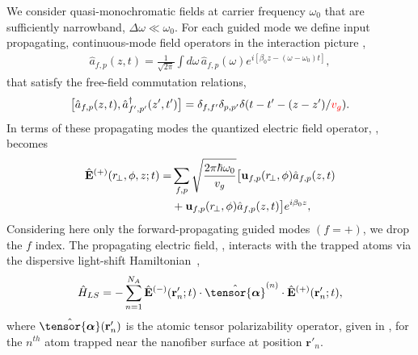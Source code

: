 \documentclass[aps,pra,twocolumn]{revtex4-1} %
\newcommand{\poltens}{\hat{\tensor{\boldsymbol{\alpha}}}}
\newcommand{\error}[1]{{\color{red} #1}}
\begin{document}
We consider quasi-monochromatic fields at carrier frequency $\omega_0$ that are sufficiently narrowband, $\Delta \omega \ll \omega_0$. 
For each guided mode we define input propagating, continuous-mode field operators in the interaction picture \cite{gardiner_input_1985, blow_continuum_1990, le_kien_correlations_2008},
	\begin{align}
		\hat{a}_{f,p}(z,t) =\frac{1}{\sqrt{2 \pi}}  \int d \omega \, \hat{a}_{f,p}(\omega) e^{i[ \beta_0 z- (\omega-\omega_0) t ]}, 
	\end{align}
that satisfy the free-field commutation relations,
	\begin{equation} \label{Eq::InputOutputCommutation}
		\big[\hat{a}_{f,p}(z,t),\hat{a}^\dag_{f',p'}(z',t')\big]=\delta_{f,f'}\delta_{p,p'}  \delta(t-t'-(z-z')/\error{v_g}).
	\end{equation}
In terms of these propagating modes the quantized electric field operator, , becomes
	\begin{align} \label{Eq::PropagatingElectricField}
		\hat{\mathbf{E}}^{(+)}(r\!_\perp,\phi,z;t) 
		=& \sum_{f,p} \sqrt{ \frac{2 \pi \hbar \omega_0}{ v_g} } \big[ \mathbf{u}_{f,p}(r\!_\perp,\phi) \hat{a}_{f,p}(z,t)\nonumber\\
		 &+ \mathbf{u}_{f,p}(r\!_\perp,\phi) \hat{a}_{f,p}(z,t) \big] e^{i \beta_0 z},
	\end{align}	
Considering here only the forward-propagating guided modes $(f=+)$, we  drop the $f$ index.  
The propagating electric field, , interacts with the trapped atoms via the dispersive light-shift Hamiltonian~\cite{deutsch_quantum_2010,kien_dynamical_2013,baragiola_open_2014},
	\begin{equation} \label{Eq::LightShiftHam}
		\hat{H}_{LS} = - \sum_{n=1}^{N_A} \hat{\mathbf{E}}^{(-)}(\mathbf{r}'_n ; t ) \cdot \poltens^{(n)} \cdot \hat{\mathbf{E}}^{(+)}(\mathbf{r}'_n ;t ),
	\end{equation}
where $\poltens(\br'_n)$ is the atomic tensor polarizability operator, given in , for the $n^{th}$ atom trapped near the nanofiber surface at position $\mathbf{r}'_n$.   
\end{document}
